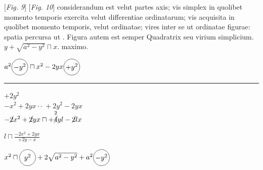 \vspace{8mm}
\hspace*{32mm} [\textit{Fig. 9}] \hspace*{55mm}  [\textit{Fig. 10}]
\pend
\vspace{2.5em}
\pstart \noindent considerandum est velut partes axis; vis simplex\protect{} in quolibet momento temporis exercita velut differentiae ordinatarum; vis acquisita\protect{} in quolibet momento temporis, velut ordinatae; vires\protect{} inter se ut ordinatae figurae: spatia percursa ut . Figura autem est semper Quadratrix  seu virium simplicium\protect{}.
\pend 
\vspace{2mm}
\count{}
\count{}
\pstart \noindent$y + \sqrt{a^2 - y^2} \sqcap x.$ maximo. \\
\rule[-4mm]{0mm}{10mm}$ a^2 \raisebox{-3.2mm}{{\def\firstcircle{(0,0) circle (0.4cm)}\begin{tikzpicture}\draw \firstcircle node {$-y^2$};\end{tikzpicture}}} \sqcap x^2 - 2yx \raisebox{-3.2mm}{{\def\firstcircle{(0,0) circle (0.4cm)}\begin{tikzpicture}\draw \firstcircle node {$+y^2$};\end{tikzpicture}}}$\\
\rule[0pt]{26mm}{0pt} $+2y^2$\\
$-x^2 + 2yx \cdot \cdot\ + 2y^2 - 2yx$\\
$-\cancel{2}x^2 + \cancel{2}yx \sqcap + \overset{2}{\cancel4}yl - \cancel{2}lx$\\
\rule[-4mm]{0pt}{10mm}$l \sqcap \displaystyle\frac{-2x^2 + 2yx}{+2y - x}$\\
\rule[-4mm]{0pt}{10mm}$x^2 \sqcap \raisebox{-3.2mm}{{\def\firstcircle{(0,0) circle (0.4cm)}\begin{tikzpicture}\draw \firstcircle node {$y^2$};\end{tikzpicture}}} + 2\sqrt{a^2 - y^2} + a^2 \raisebox{-3.2mm}{{\def\firstcircle{(0,0) circle (0.4cm)}\begin{tikzpicture}\draw \firstcircle node {$-y^2$};\end{tikzpicture}}}$\\
